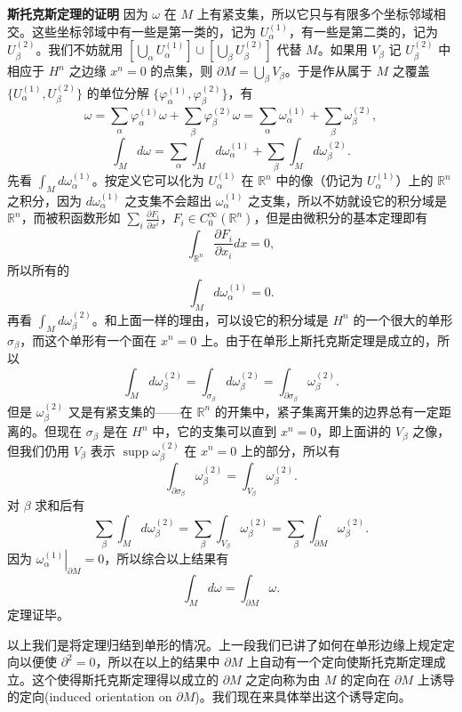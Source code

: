 \noindent\textbf{斯托克斯定理的证明}\quad
因为 $\omega$ 在 $M$ 上有紧支集，所以它只与有限多个坐标邻域相交。这些坐标邻域中有一些是第一类的，记为 $U_\alpha^{(1)}$，有一些是第二类的，记为 $U_\beta^{(2)}$。我们不妨就用 $[\bigcup_\alpha U_\alpha^{(1)}]\cup[\bigcup_\beta U_\beta^{(2)}]$ 代替 $M$。如果用 $V_\beta$ 记 $U_\beta^{(2)}$ 中相应于 $H^n$ 之边缘 $x^n=0$ 的点集，则 $\partial M=\bigcup_\beta V_\beta$。于是作从属于 $M$ 之覆盖 $\{U_\alpha^{(1)},U_\beta^{(2)}\}$ 的单位分解 $\{\varphi_\alpha^{(1)},\varphi_\beta^{(2)}\}$，有
\[
 \omega=\sum_\alpha\varphi_\alpha^{(1)}\omega+\sum_\beta\varphi_\beta^{(2)}\omega
 =\sum_\alpha\omega_\alpha^{(1)}+\sum_\beta\omega_\beta^{(2)},
\]
\[
 \int_Md\omega=\sum_\alpha\int_Md\omega_\alpha^{(1)}+
 \sum_\beta\int_Md\omega_\beta^{(2)}.
\]
先看 $\int_Md\omega_\alpha^{(1)}$。按定义它可以化为 $U_\alpha^{(1)}$ 在 $\mathbb R^n$ 中的像（仍记为 $U_\alpha^{(1)}$）上的 $\mathbb R^n$ 之积分，因为 $d\omega_\alpha^{(1)}$ 之支集不会超出 $\omega_\alpha^{(1)}$ 之支集，所以不妨就设它的积分域是 $\mathbb R^n$，而被积函数形如 $\sum_i\frac{\partial F_i}{\partial x^i}$，$F_i\in C_0^\infty(\mathbb R^n)$，但是由微积分的基本定理即有
\[
 \int_{\mathbb R^n}\frac{\partial F_i}{\partial x_i}dx=0,
\]
所以所有的
\[
 \int_Md\omega_\alpha^{(1)}=0.
\]
再看 $\int_Md\omega_\beta^{(2)}$。和上面一样的理由，可以设它的积分域是 $H^n$ 的一个很大的单形 $\sigma_\beta$，而这个单形有一个面在 $x^n=0$ 上。由于在单形上斯托克斯定理是成立的，所以
\[
 \int_Md\omega_\beta^{(2)}=\int_{\sigma_\beta}d\omega_\beta^{(2)}
 =\int_{\partial\sigma_\beta}\omega_\beta^{(2)}.
\]
但是 $\omega_\beta^{(2)}$ 又是有紧支集的——在 $\mathbb R^n$ 的开集中，紧子集离开集的边界总有一定距离的。但现在 $\sigma_\beta$ 是在 $H^n$ 中，它的支集可以直到 $x^n=0$，即上面讲的 $V_\beta$ 之像，但我们仍用 $V_\beta$ 表示 $\operatorname{supp}\omega_\beta^{(2)}$ 在 $x^n=0$ 上的部分，所以有
\[
 \int_{\partial\sigma_\beta}\omega_\beta^{(2)}=
 \int_{V_\beta}\omega_\beta^{(2)}.
\]
对 $\beta$ 求和后有
\[
 \sum_\beta\int_Md\omega_\beta^{(2)}
 =\sum_\beta\int_{V_\beta}\omega_\beta^{(2)}
 =\sum_\beta\int_{\partial M}\omega_\beta^{(2)}.
\]
因为 $\left.\omega_\alpha^{(1)}\right|_{\partial M}=0$，所以综合以上结果有
\[
 \int_Md\omega=\int_{\partial M}\omega.
\]
定理证毕。

以上我们是将定理归结到单形的情况。上一段我们已讲了如何在单形边缘上规定定向以便使 $\partial^2=0$，所以在以上的结果中 $\partial M$ 上自动有一个定向使斯托克斯定理成立。这个使得斯托克斯定理得以成立的 $\partial M$ 之定向称为由 $M$ 的定向在 $\partial M$ 上诱导的定向(induced orientation on $\partial M$)。我们现在来具体举出这个诱导定向。

